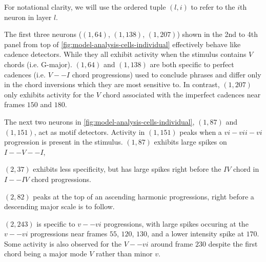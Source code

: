 For notational clarity, we will use the ordered tuple $(l,i)$ to refer to the
$i$th neuron in layer $l$.

The first three neurons ($(1,64)$, $(1,138)$, $(1,207)$) shown in the 2nd to
4th panel from top of \cref{fig:model-analysis-cells-individual} effectively
behave like cadence detectors. While they all exhibit activity when the
stimulus contains $V$ chords (i.e. G-major). $(1,64)$ and $(1,138)$ are both
specific to perfect cadences (i.e. $V -- I$ chord progressions) used to
conclude phrases and differ only in the chord inversions which they are most
sensitive to. In contrast, $(1,207)$ only exhibits activity for the $V$ chord
associated with the imperfect cadences near frames $150$ and $180$.

The next two neurons in \cref{fig:model-analysis-cells-individual}, $(1,87)$
and $(1,151)$, act as motif detectors. Activity in $(1,151)$ peaks when a $vi-vii-vi$
progression is present in the stimulus. $(1,87)$ exhibits large spikes on $I--V--I$,

$(2,37)$ exhibits less specificity, but has large spikes right before the $IV$ chord
in $I--IV$ chord progressions.

$(2,82)$ peaks at the top of an ascending harmonic progressions, right before a descending
major scale is to follow.

$(2, 243)$ is specific to $v -- vi$ progressions, with large spikes occuring at
the $v -- vi$ progressions near frames $55$, $120$, $130$, and a lower intensity spike at
$170$. Some activity is also observed for the $V -- vi$ around frame $230$ despite
the first chord being a major mode $V$ rather than minor $v$.

